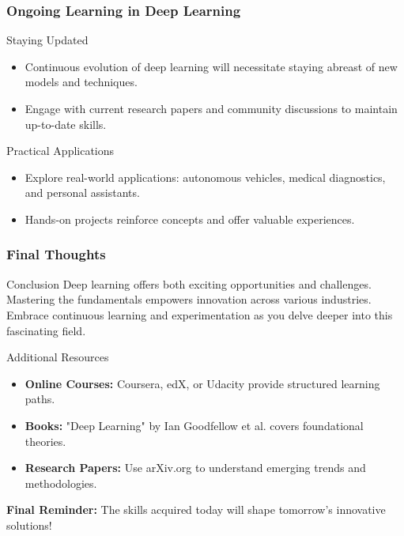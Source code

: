 \documentclass[aspectratio=169]{beamer}
\begin{document}
\begin{frame}[fragile]
    \frametitle{Ongoing Learning in Deep Learning}
    \begin{block}{Staying Updated}
        \begin{itemize}
            \item Continuous evolution of deep learning will necessitate staying abreast of new models and techniques.
            \item Engage with current research papers and community discussions to maintain up-to-date skills.
        \end{itemize}
    \end{block}
    
    \begin{block}{Practical Applications}
        \begin{itemize}
            \item Explore real-world applications: autonomous vehicles, medical diagnostics, and personal assistants.
            \item Hands-on projects reinforce concepts and offer valuable experiences.
        \end{itemize}
    \end{block}
\end{frame}

\begin{frame}[fragile]
    \frametitle{Final Thoughts}
    \begin{block}{Conclusion}
        Deep learning offers both exciting opportunities and challenges. Mastering the fundamentals empowers innovation across various industries. Embrace continuous learning and experimentation as you delve deeper into this fascinating field.
    \end{block}
    
    \begin{block}{Additional Resources}
        \begin{itemize}
            \item \textbf{Online Courses:} Coursera, edX, or Udacity provide structured learning paths.
            \item \textbf{Books:} "Deep Learning" by Ian Goodfellow et al. covers foundational theories.
            \item \textbf{Research Papers:} Use arXiv.org to understand emerging trends and methodologies.
        \end{itemize}
    \end{block}
    
    \textbf{Final Reminder:} The skills acquired today will shape tomorrow's innovative solutions!
\end{frame}
\end{document}
